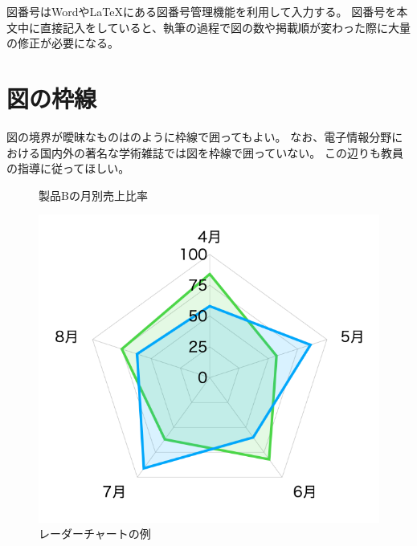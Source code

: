 図番号はWordや\LaTeX にある図番号管理機能を利用して入力する。
図番号を本文中に直接記入をしていると、執筆の過程で図の数や掲載順が変わった際に大量の修正が必要になる。


\section{図の枠線}

図の境界が曖昧なものはのように枠線で囲ってもよい。
なお、電子情報分野における国内外の著名な学術雑誌では図を枠線で囲っていない。
この辺りも教員の指導に従ってほしい。

\begin{figure}[H]
  \centering
  \caption{製品Bの月別売上比率}
  \label{fig:chart2}
\end{figure}

\begin{figure}[H]
  \centering
  \includegraphics[width=.4\linewidth]{./fig/chart3.png}
  \caption{レーダーチャートの例}
  \label{fig:chart3}
\end{figure}

